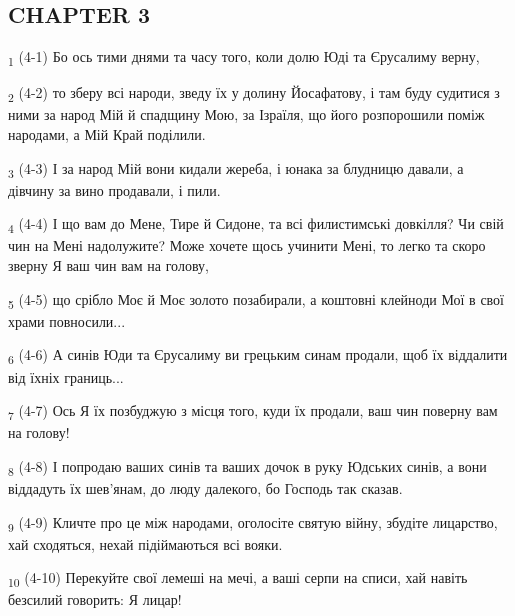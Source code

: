 \subsection{CHAPTER 3}
\begin{tcolorbox}
\textsubscript{1} (4-1) Бо ось тими днями та часу того, коли долю Юді та Єрусалиму верну,
\end{tcolorbox}
\begin{tcolorbox}
\textsubscript{2} (4-2) то зберу всі народи, зведу їх у долину Йосафатову, і там буду судитися з ними за народ Мій й спадщину Мою, за Ізраїля, що його розпорошили поміж народами, а Мій Край поділили.
\end{tcolorbox}
\begin{tcolorbox}
\textsubscript{3} (4-3) І за народ Мій вони кидали жереба, і юнака за блудницю давали, а дівчину за вино продавали, і пили.
\end{tcolorbox}
\begin{tcolorbox}
\textsubscript{4} (4-4) І що вам до Мене, Тире й Сидоне, та всі филистимські довкілля? Чи свій чин на Мені надолужите? Може хочете щось учинити Мені, то легко та скоро зверну Я ваш чин вам на голову,
\end{tcolorbox}
\begin{tcolorbox}
\textsubscript{5} (4-5) що срібло Моє й Моє золото позабирали, а коштовні клейноди Мої в свої храми повносили...
\end{tcolorbox}
\begin{tcolorbox}
\textsubscript{6} (4-6) А синів Юди та Єрусалиму ви грецьким синам продали, щоб їх віддалити від їхніх границь...
\end{tcolorbox}
\begin{tcolorbox}
\textsubscript{7} (4-7) Ось Я їх позбуджую з місця того, куди їх продали, ваш чин поверну вам на голову!
\end{tcolorbox}
\begin{tcolorbox}
\textsubscript{8} (4-8) І попродаю ваших синів та ваших дочок в руку Юдських синів, а вони віддадуть їх шев'янам, до люду далекого, бо Господь так сказав.
\end{tcolorbox}
\begin{tcolorbox}
\textsubscript{9} (4-9) Кличте про це між народами, оголосіте святую війну, збудіте лицарство, хай сходяться, нехай підіймаються всі вояки.
\end{tcolorbox}
\begin{tcolorbox}
\textsubscript{10} (4-10) Перекуйте свої лемеші на мечі, а ваші серпи на списи, хай навіть безсилий говорить: Я лицар!
\end{tcolorbox}
